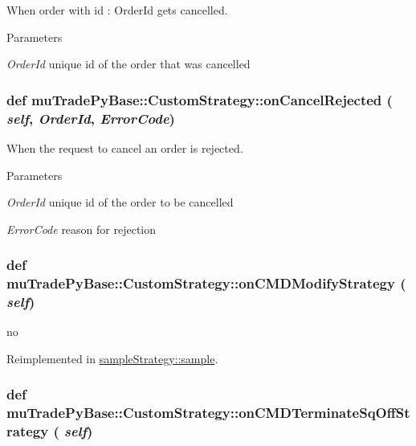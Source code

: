 When order with id : OrderId gets cancelled. 
\begin{DoxyParams}{Parameters}
\item[{\em OrderId}]unique id of the order that was cancelled \end{DoxyParams}
\hypertarget{classmuTradePyBase_1_1CustomStrategy_ac0dc077ece6c64c2a61ee3b9f511c680}{
\subsubsection[{onCancelRejected}]{\setlength{\rightskip}{0pt plus 5cm}def muTradePyBase::CustomStrategy::onCancelRejected ( {\em self}, \/   {\em OrderId}, \/   {\em ErrorCode})}}
\label{classmuTradePyBase_1_1CustomStrategy_ac0dc077ece6c64c2a61ee3b9f511c680}


When the request to cancel an order is rejected. 
\begin{DoxyParams}{Parameters}
\item[{\em OrderId}]unique id of the order to be cancelled \item[{\em ErrorCode}]reason for rejection \end{DoxyParams}
\hypertarget{classmuTradePyBase_1_1CustomStrategy_af8fb22d6864e7c61a61f94cf963746e5}{
\subsubsection[{onCMDModifyStrategy}]{\setlength{\rightskip}{0pt plus 5cm}def muTradePyBase::CustomStrategy::onCMDModifyStrategy ( {\em self})}}
\label{classmuTradePyBase_1_1CustomStrategy_af8fb22d6864e7c61a61f94cf963746e5}


no 

Reimplemented in \hyperlink{classsampleStrategy_1_1sample_afba39e39a71fd78abc113b6bdcbd0c7e}{sampleStrategy::sample}.\hypertarget{classmuTradePyBase_1_1CustomStrategy_a8b35516aaa2a7f1940ad86191e022b8e}{
\subsubsection[{onCMDTerminateSqOffStrategy}]{\setlength{\rightskip}{0pt plus 5cm}def muTradePyBase::CustomStrategy::onCMDTerminateSqOffStrategy ( {\em self})}}
\label{classmuTradePyBase_1_1CustomStrategy_a8b35516aaa2a7f1940ad86191e022b8e}


